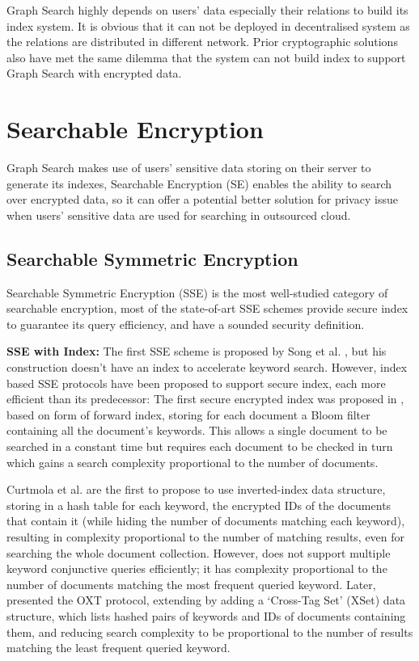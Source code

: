 Graph Search highly depends on users' data especially their relations to build its index system. It is obvious that it can not be deployed in decentralised system as the relations are distributed in different network. Prior cryptographic solutions also have met the same dilemma that the system can not build index to support Graph Search with encrypted data. 

\section{Searchable Encryption}
Graph Search makes use of users' sensitive data storing on their server to generate its indexes, Searchable Encryption (SE) enables the ability to search over encrypted data, so it can offer a potential better solution for privacy issue when users' sensitive data are used for searching in outsourced cloud.

\subsection{Searchable Symmetric Encryption}
Searchable Symmetric Encryption (SSE) is  the most well-studied category of searchable encryption, most of the state-of-art SSE schemes provide secure index to guarantee its query efficiency, and have a sounded security definition.

{\bf SSE with Index:} The first SSE scheme is proposed by Song et al. \cite{song2000practical}, but his construction doesn't have an index to accelerate keyword search. However, index based SSE protocols have been proposed to support secure index, each more efficient than its predecessor: The first secure encrypted index was proposed in \cite{goh2003secure}, based on form of forward index, storing for each document a Bloom filter containing all the document's keywords. This allows a single document to be searched in a constant time but requires each document to be checked in turn which gains a search complexity proportional to the number of documents.

Curtmola et al. \cite{curtmola2011searchable} are the first to propose to use inverted-index data structure, storing in a hash table for each keyword, the encrypted IDs of the documents that contain it (while hiding the number of documents matching each keyword), resulting in complexity proportional to the number of matching results, even for searching the whole document collection. However, \cite{curtmola2011searchable} does not support multiple keyword conjunctive queries efficiently; it has complexity proportional to the number of documents matching the most frequent queried keyword. Later, \cite{cash2013highly} presented the OXT protocol, extending \cite{curtmola2011searchable} by adding a `Cross-Tag Set' (XSet) data structure, which lists hashed pairs of keywords and IDs of documents containing them, and reducing search complexity to be proportional to the number of results matching the least frequent queried keyword.

